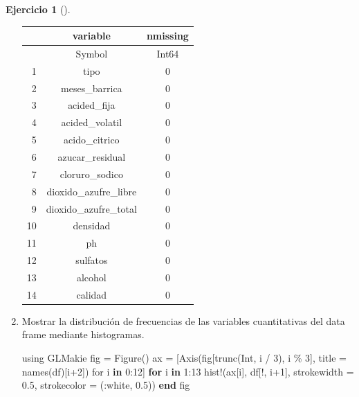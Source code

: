 \documentclass[
  a4paper,
]{scrreport}
\newenvironment{Shaded}{\begin{snugshade}}{\end{snugshade}}
\newcommand{\BuiltInTok}[1]{\textcolor[rgb]{0.00,0.23,0.31}{#1}}
\newcommand{\ControlFlowTok}[1]{\textcolor[rgb]{0.00,0.23,0.31}{\textbf{#1}}}
\newcommand{\DataTypeTok}[1]{\textcolor[rgb]{0.68,0.00,0.00}{#1}}
\newcommand{\FloatTok}[1]{\textcolor[rgb]{0.68,0.00,0.00}{#1}}
\newcommand{\FunctionTok}[1]{\textcolor[rgb]{0.28,0.35,0.67}{#1}}
\newcommand{\ImportTok}[1]{\textcolor[rgb]{0.00,0.46,0.62}{#1}}
\newcommand{\KeywordTok}[1]{\textcolor[rgb]{0.00,0.23,0.31}{\textbf{#1}}}
\newcommand{\NormalTok}[1]{\textcolor[rgb]{0.00,0.23,0.31}{#1}}
\newcommand{\OperatorTok}[1]{\textcolor[rgb]{0.37,0.37,0.37}{#1}}
\theoremstyle{definition}
\newtheorem{exercise}{Ejercicio}[chapter]
\theoremstyle{remark}
\begin{document}
\begin{exercise}[]
\begin{enumerate}
\begin{tcolorbox}
  \begin{tabular}{r|cc}
      & variable & nmissing\\
      \hline
      & Symbol & Int64\\
      \hline
      1 & tipo & 0 \\
      2 & meses\_barrica & 0 \\
      3 & acided\_fija & 0 \\
      4 & acided\_volatil & 0 \\
      5 & acido\_citrico & 0 \\
      6 & azucar\_residual & 0 \\
      7 & cloruro\_sodico & 0 \\
      8 & dioxido\_azufre\_libre & 0 \\
      9 & dioxido\_azufre\_total & 0 \\
      10 & densidad & 0 \\
      11 & ph & 0 \\
      12 & sulfatos & 0 \\
      13 & alcohol & 0 \\
      14 & calidad & 0 \\
  \end{tabular}

  \end{tcolorbox}
\item
  Mostrar la distribución de frecuencias de las variables cuantitativas
  del data frame mediante histogramas.

  \begin{tcolorbox}[enhanced jigsaw, left=2mm, colback=white, coltitle=black, opacitybacktitle=0.6, titlerule=0mm, breakable, bottomrule=.15mm, toptitle=1mm, bottomtitle=1mm, colbacktitle=quarto-callout-tip-color!10!white, opacityback=0, rightrule=.15mm, title=\textcolor{quarto-callout-tip-color}{\faLightbulb}\hspace{0.5em}{Solución}, colframe=quarto-callout-tip-color-frame, arc=.35mm, leftrule=.75mm, toprule=.15mm]

\begin{Shaded}
\begin{Highlighting}[]
\ImportTok{using} \BuiltInTok{GLMakie}
\NormalTok{fig }\OperatorTok{=} \FunctionTok{Figure}\NormalTok{() }
\NormalTok{ax }\OperatorTok{=}\NormalTok{ [}\FunctionTok{Axis}\NormalTok{(fig[}\FunctionTok{trunc}\NormalTok{(}\DataTypeTok{Int}\NormalTok{, i }\OperatorTok{/} \FloatTok{3}\NormalTok{), i }\OperatorTok{\%} \FloatTok{3}\NormalTok{], title }\OperatorTok{=} \FunctionTok{names}\NormalTok{(df)[i}\OperatorTok{+}\FloatTok{2}\NormalTok{]) for i }\KeywordTok{in} \FloatTok{0}\OperatorTok{:}\FloatTok{12}\NormalTok{]}
\ControlFlowTok{for}\NormalTok{ i }\KeywordTok{in} \FloatTok{1}\OperatorTok{:}\FloatTok{13}
    \FunctionTok{hist!}\NormalTok{(ax[i], df[!, i}\OperatorTok{+}\FloatTok{1}\NormalTok{], strokewidth }\OperatorTok{=} \FloatTok{0.5}\NormalTok{, strokecolor }\OperatorTok{=}\NormalTok{ (}\OperatorTok{:}\NormalTok{white, }\FloatTok{0.5}\NormalTok{))}
\ControlFlowTok{end}
\NormalTok{fig}
\end{Highlighting}
\end{Shaded}


\end{tcolorbox}
\end{enumerate}
\end{exercise}
\end{document}
